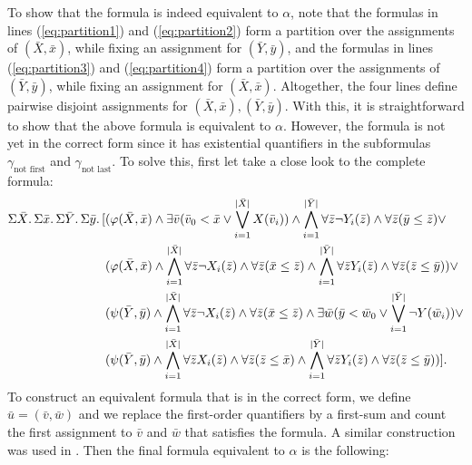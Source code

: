 To show that the formula is indeed equivalent to $\alpha$, note that the formulas in lines (\ref{eq:partition1}) and (\ref{eq:partition2}) form a partition over the assignments of $(\bar{X},\bar{x})$, while fixing an assignment for $(\bar{Y},\bar{y})$, and the formulas in lines (\ref{eq:partition3}) and (\ref{eq:partition4}) form a partition over the assignments of $(\bar{Y},\bar{y})$, while fixing an assignment for $(\bar{X},\bar{x})$. Altogether, the four lines define pairwise disjoint assignments for $(\bar{X},\bar{x}),(\bar{Y},\bar{y})$. With this, it is straightforward to show that the above formula is equivalent to $\alpha$. However, the formula is not yet in the correct form since it has existential quantifiers in the subformulas $\gamma_{\text{not first}}$ and $\gamma_{\text{not last}}$. To solve this, first let take a close look to the complete formula:
\begin{align*}
\Sigma{\bar{X}}.\,\Sigma{\bar{x}}.\,\Sigma{\bar{Y}}.\,\Sigma{\bar{y}}.\,[&(\varphi(\bar{X},\bar{x})\wedge\exists\bar{v}(\bar{v}_0 < \bar{x} \vee \bigvee_{i = 1}^{\vert \bar{X} \vert}X(\bar{v}_i))\wedge\bigwedge_{i = 1}^{\vert \bar{Y} \vert} \forall\bar{z}\neg Y_i(\bar{z}) \wedge \forall\bar{z}(\bar{y}\leq\bar{z})\vee\\
&(\varphi(\bar{X},\bar{x})\wedge\bigwedge_{i = 1}^{\vert \bar{X} \vert} \forall\bar{z}\neg X_i(\bar{z}) \wedge \forall\bar{z}(\bar{x}\leq\bar{z})\wedge\bigwedge_{i = 1}^{\vert \bar{Y} \vert} \forall\bar{z} Y_i(\bar{z}) \wedge \forall\bar{z}(\bar{z}\leq\bar{y}))\vee\\
&(\psi(\bar{Y},\bar{y})\wedge\bigwedge_{i = 1}^{\vert \bar{X} \vert} \forall\bar{z}\neg X_i(\bar{z}) \wedge \forall\bar{z}(\bar{x}\leq\bar{z})\wedge\exists\bar{w}(\bar{y} < \bar{w}_0 \vee \bigvee_{i = 1}^{\vert \bar{Y} \vert}\neg Y(\bar{w}_i))\vee\\
&(\psi(\bar{Y},\bar{y})\wedge\bigwedge_{i = 1}^{\vert \bar{X} \vert} \forall\bar{z} X_i(\bar{z}) \wedge \forall\bar{z}(\bar{z}\leq\bar{x})\wedge\bigwedge_{i = 1}^{\vert \bar{Y} \vert} \forall\bar{z} Y_i(\bar{z}) \wedge \forall\bar{z}(\bar{z}\leq\bar{y}))].
\end{align*}
To construct an equivalent formula that is in the correct form, we define $\bar{u} = (\bar{v},\bar{w})$ and we replace the first-order quantifiers by a first-sum and count the first assignment to $\bar{v}$ and $\bar{w}$ that satisfies the formula. A similar construction was used in \cite{SalujaST95}. Then the final formula equivalent to $\alpha$ is the following:
